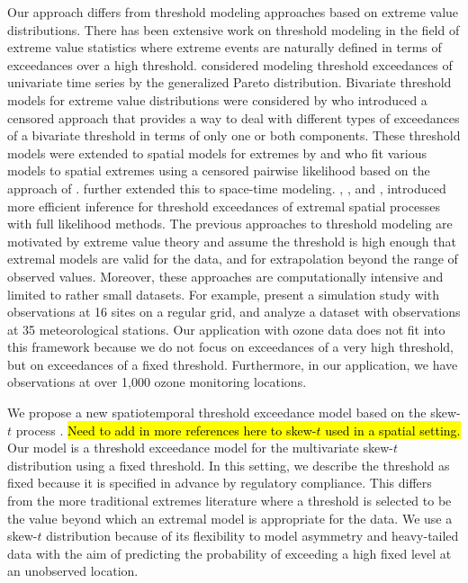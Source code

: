 \documentclass[useAMS,usenatbib,referee]{biom}
\begin{document}
Our approach differs from threshold modeling approaches based on extreme value distributions.
There has been extensive work on threshold modeling in the field of extreme value statistics where extreme events are naturally defined in terms of exceedances over a high threshold.
\citet{Davison1990} considered modeling threshold exceedances of univariate time series by the generalized Pareto distribution.
Bivariate threshold models for extreme value distributions were considered by \citet{Ledford1996} who introduced a censored approach that provides a way to deal with different types of exceedances of a bivariate threshold in terms of only one or both components.
These threshold models were extended to spatial models for extremes by \citet{Wadsworth2012} and \citet{Thibaud2013} who fit various models to spatial extremes using a censored pairwise likelihood \citep{Padoan2010} based on the approach of \citet{Ledford1996}.
\citet{Huser2014} further extended this to space-time modeling.
\citet{Thibaud2013a}, \citet{Engelke2014}, and \citet{Wadsworth2014}, introduced more efficient inference for threshold exceedances of extremal spatial processes with full likelihood methods.
The previous approaches to threshold modeling are motivated by extreme value theory and assume the threshold is high enough that extremal models are valid for the data, and for extrapolation beyond the range of observed values.
Moreover, these approaches are computationally intensive and limited to rather small datasets.
For example, \citet{Wadsworth2014} present a simulation study with observations at 16 sites on a regular grid, and \citet{Engelke2014} analyze a dataset with observations at 35 meteorological stations.
Our application with ozone data does not fit into this framework because we do not focus on exceedances of a very high threshold, but on exceedances of a fixed threshold.
Furthermore, in our application, we have observations at over 1,000 ozone monitoring locations.

We propose a new spatiotemporal threshold exceedance model based on the skew-$t$ process \citep{Padoan2011}.
\hl{Need to add in more references here to skew-$t$ used in a spatial setting.}
Our model is a threshold exceedance model for the multivariate skew-$t$ distribution using a fixed threshold.
In this setting, we describe the threshold as fixed because it is specified in advance by regulatory compliance.
This differs from the more traditional extremes literature where a threshold is selected to be the value beyond which an extremal model is appropriate for the data.
We use a skew-$t$ distribution because of its flexibility to model asymmetry and heavy-tailed data with the aim of predicting the probability of exceeding a high fixed level at an unobserved location.
\end{document}
